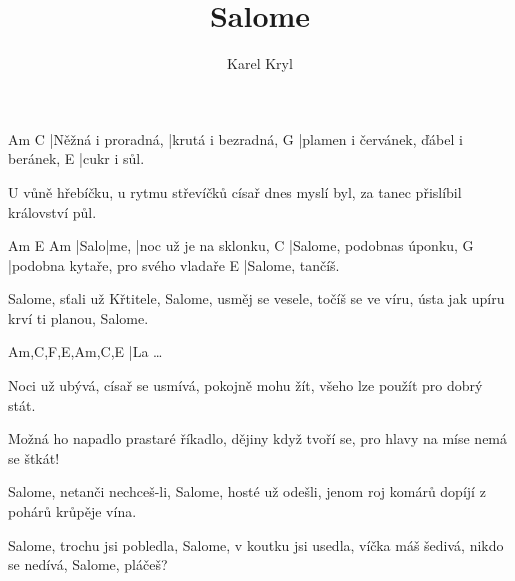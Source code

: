 \documentclass{song}
\title{Salome}
\author{Karel Kryl}
\begin{document}
\strophe
Am                 C
|Něžná i proradná, |krutá i bezradná,
G
|plamen i červánek, ďábel i beránek,
E
|cukr i sůl.
\endstrophe

\strophe*
U vůně hřebíčku, u rytmu střevíčků
císař dnes myslí byl, za tanec přislíbil
království půl.
\endstrophe

\strophe
Am   E    Am
|Salo|me, |noc už je na sklonku,
C
|Salome, podobnas úponku,
G
|podobna kytaře, pro svého vladaře
E
|Salome, tančíš.
\endstrophe

\strophe*
Salome, sťali už Křtitele,
Salome, usměj se vesele,
točíš se ve víru, ústa jak upíru
krví ti planou, Salome.
\endstrophe

\strophe
Am,C,F,E,Am,C,E
|La \ldots
\endstrophe

\strophe*
Noci už ubývá, císař se usmívá,
pokojně mohu žít, všeho lze použít
pro dobrý stát.
\endstrophe

\strophe*
Možná ho napadlo prastaré říkadlo,
dějiny když tvoří se, pro hlavy na míse
nemá se štkát!
\endstrophe

\strophe*
Salome, netanči nechceš-li,
Salome, hosté už odešli,
jenom roj komárů dopíjí z pohárů
krůpěje vína.
\endstrophe

\strophe*
Salome, trochu jsi pobledla,
Salome, v koutku jsi usedla,
víčka máš šedivá, nikdo se nedívá,
Salome, pláčeš?
\endstrophe
\end{document}
